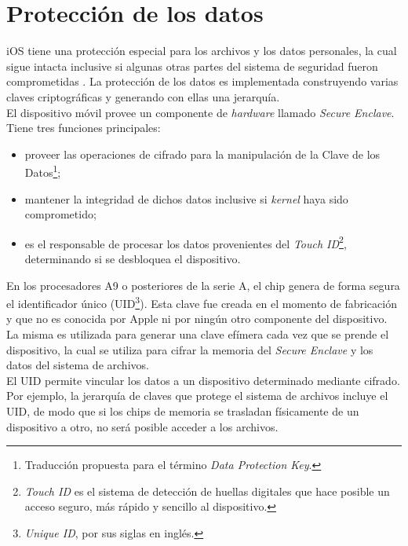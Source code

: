 \section{Protección de los datos} \label{fig:ch02:data-protection}
iOS tiene una protección especial para los archivos y los datos personales, la cual sigue intacta inclusive si algunas otras partes del sistema de seguridad fueron comprometidas \cite{asg}. La protección de los datos es implementada construyendo varias claves criptográficas y generando con ellas una jerarquía.\\
El dispositivo móvil provee un componente de \textit{hardware} llamado \textit{Secure Enclave}. Tiene tres funciones principales:
\begin{itemize}
    \item proveer las operaciones de cifrado para la manipulación de la Clave de los Datos\footnote{Traducción propuesta para el término \textit{Data Protection Key}.};
    \item mantener la integridad de dichos datos inclusive si \textit{kernel} haya sido comprometido;
    \item es el responsable de procesar los datos provenientes del \textit{Touch ID}\footnote{\textit{Touch ID} es el sistema de detección de huellas digitales que hace posible un acceso seguro, más rápido y sencillo al dispositivo.}, determinando si se desbloquea el dispositivo.
\end{itemize}
En los procesadores A9 o posteriores de la serie A, el chip genera de forma segura el identificador único (UID\footnote{\textit{Unique ID}, por sus siglas en inglés.}). Esta clave fue creada en el momento de fabricación y que no es conocida por Apple ni por ningún otro componente del dispositivo. La misma es utilizada para generar una clave efímera cada vez que se prende el dispositivo, la cual se utiliza para cifrar la memoria del \textit{Secure Enclave} y los datos del sistema de archivos.\\
El UID permite vincular los datos a un dispositivo determinado mediante cifrado. Por ejemplo, la jerarquía de claves que protege el sistema de archivos incluye el UID, de modo que si los chips de memoria se trasladan físicamente de un dispositivo a otro, no será posible acceder a los archivos.
